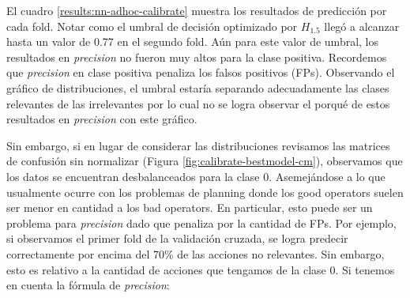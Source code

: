 \begin{table}[h!]
    \centering
     \caption{Métricas sobre validación cruzada del modelo NN ad-hoc.}
     \label{results:nn-adhoc-calibrate}
\end{table}

El cuadro \ref{results:nn-adhoc-calibrate} muestra los resultados de predicción
por cada fold. Notar como el umbral de decisión optimizado por $H_{1.5}$ llegó a
alcanzar hasta un valor de 0.77 en el segundo fold. Aún para este valor de
umbral, los resultados en \emph{precision} no fueron muy altos para la clase
positiva. Recordemos que \emph{precision} en clase positiva penaliza los falsos
positivos (FPs). Observando el gráfico de distribuciones, el umbral estaría
separando adecuadamente las clases relevantes de las irrelevantes por lo cual no
se logra observar el porqué de estos resultados en \emph{precision} con este
gráfico.

Sin embargo, si en lugar de considerar las distribuciones revisamos las matrices
de confusión sin normalizar (Figura \ref{fig:calibrate-bestmodel-cm}),
observamos que los datos se encuentran desbalanceados para la clase 0.
Asemejándose a lo que usualmente ocurre con los problemas de planning donde los
good operators suelen ser menor en cantidad a los bad operators. En particular,
esto puede ser un problema para \emph{precision} dado que penaliza por la
cantidad de FPs. Por ejemplo, si observamos el primer fold de la validación
cruzada, se logra predecir correctamente por encima del 70\% de las acciones no
relevantes. Sin embargo, esto es relativo a la cantidad de acciones que tengamos
de la clase 0. Si tenemos en cuenta la fórmula de \emph{precision}:

